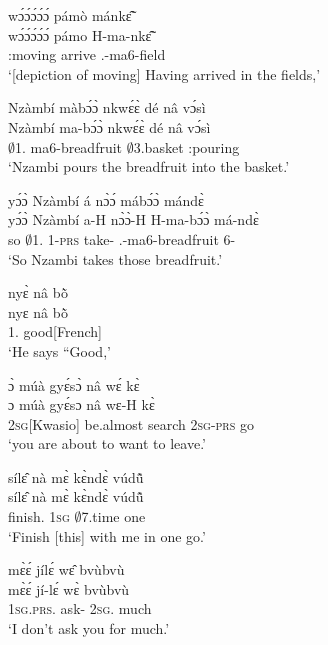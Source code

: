 \begin{exe}[(N234)]
\exN\label{n56}
  \glll wɔ́ɔ́ɔ́ɔ́ɔ́ pámò mánkɛ̃̂ \\
        wɔ́ɔ́ɔ́ɔ́ɔ́ pámo H-ma-nkɛ̃̂ \\
        {\IDEO}:moving arrive {\OBJ}.{\LINK}-ma6-field    \\
    \trans `[depiction of moving] Having arrived in the fields,'
 
\exN\label{n57}
  \glll Nzàmbí màbɔ́ɔ̀ nkwɛ́ɛ̀ dé nâ vɔ́sì \\
        Nzàmbí ma-bɔ́ɔ̀ nkwɛ́ɛ̀ dé nâ vɔ́sì \\
          $\emptyset$1.{\PN} ma6-breadfruit $\emptyset$3.basket {\LOC} {\COMP} {\IDEO}:pouring\\
    \trans `Nzambi pours the breadfruit into the basket.'
 
\exN\label{n58}
  \glll yɔ́ɔ̀ Nzàmbí á nɔ̀ɔ́ mábɔ́ɔ̀ mándɛ̀\\
         yɔ́ɔ̀ Nzàmbí a-H nɔ̀ɔ̀-H H-ma-bɔ́ɔ̀ má-ndɛ̀\\
          so $\emptyset$1.{\PN} 1-\textsc{prs} take-{\R} {\OBJ}.{\LINK}-ma6-breadfruit 6-{\ANA}\\
    \trans `So Nzambi takes those breadfruit.'
 
\exN\label{n59}
  \glll nyɛ̀ nâ bõ̀ \\
       nyɛ nâ bõ̀ \\
          1.{\SBJ}  {\COMP} good[French]  \\
    \trans `He says ``Good,'
 
\exN\label{n60}
  \glll ɔ̀ múà gyɛ́sɔ̀ nâ wɛ́ kɛ̀ \\
       ɔ múà gyɛ́sɔ nâ wɛ-H kɛ̀ \\
         2\textsc{sg}[Kwasio] be.almost search {\COMP} 2\textsc{sg}-\textsc{prs} go   \\
    \trans `you are about to want to leave.'
 
\exN\label{n61}
  \glll sílɛ̂ nà mɛ̀ kɛ̀ndɛ̀ vúdũ̂ \\
         sílɛ̂ nà mɛ̀ kɛ̀ndɛ̀ vúdũ̂ \\
         finish.{\IMP}  {\COM} 1\textsc{sg} $\emptyset$7.time one   \\
    \trans `Finish [this] with me in one go.'
 
\exN\label{n62}
  \glll mɛ̀ɛ́ jílɛ́ wɛ̂ bvùbvù \\
       mɛ̀ɛ́ jí-lɛ́ wɛ̀ bvùbvù \\
         1\textsc{sg}.\textsc{prs}.{\NEG} ask-{\NEG} 2\textsc{sg}.{\OBJ} much \\
    \trans `I don't ask you for much.'
 

\end{exe}
